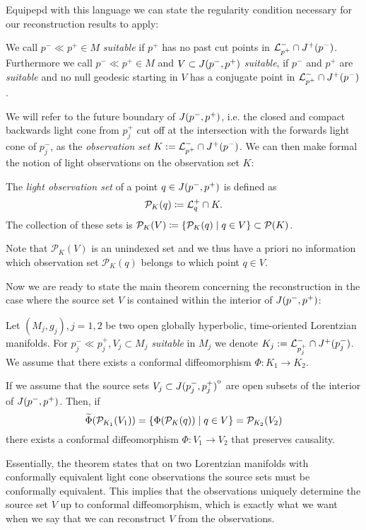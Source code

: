 Equipepd with this language we can state the regularity condition necessary for our reconstruction results to apply:
\begin{definition}[Suitable]
    We call $p^-\ll p^+\in M$  \emph{suitable} if $p^+$ has no past cut points in ${\mathcal{L}}^-_{p^+}\cap J^+(p^-)$. Furthermore we call $p^-\ll p^+\in M$ and $V\subset J(p^-,p^+)$ \emph{suitable}, if $p^-$ and $p^+$ are \emph{suitable} and no null geodesic starting in $V$ has a conjugate point in ${\mathcal{L}}^-_{p^+}\cap J^+(p^-)$.
\end{definition}
We will refer to the future boundary of $J(p^-,p^+)$, i.e. the closed and compact backwards light cone from $p_j^+$ cut off at the intersection with the forwards light cone of $p_j^-$, as the \emph{observation set} $K:={\mathcal{L}}^-_{p^+}\cap J^+(p^-)$. We can then make formal the notion of light observations on the observation set $K$:
\begin{definition}
    The \emph{light observation set} of a point $q\in J(p^-,p^+)$ is defined as
    \[
    {\mathcal{P}}_K(q) \coloneqq {\mathcal{L}}^+_q \cap K.
    \]
    The collection of these sets is ${\mathcal{P}}_K(V)\coloneqq\{\mathcal{P}_K(q)\mid q\in V\}\subset {\mathcal{P}}(K)$.
\end{definition}
Note that $\mathcal{P}_K(V)$ is an unindexed set and we thus have a priori no information which observation set $\mathcal{P}_K(q)$ belongs to which point $q\in V$.

Now we are ready to state the main theorem concerning the reconstruction in the case where the source set $V$ is contained within the interior of $J(p^-,p^+)$:
\begin{theorem}\label{thm:intreconstr}
    Let $(M_j,g_j), j=1,2$ be two open globally hyperbolic, time-oriented Lorentzian manifolds. For $p_j^-\ll p_j^+, V_j\subset M_j$ \emph{suitable} in $M_j$ we denote $K_j := {\mathcal{L}}^-_{p_j^+} \cap J^+(p_j^-)$. We assume that there exists a conformal diffeomorphism $\Phi:K_1\to K_2$. 
    
    If we assume that the source sets $V_j\subset{\kern0ptJ(p_j^-,p_j^+)}^{\mathrm{o}}$ are open subsets of the interior of $J(p^-,p^+)$. 
    Then, if 
    \[
    \widetilde{\Phi}({\mathcal{P}}_{K_1}(V_1)) = \{\Phi({\mathcal{P}}_K(q))\mid q \in V\} = {\mathcal{P}}_{K_2}(V_2)
    \]
    there exists a conformal diffeomorphism $\Phi:V_1\to V_2$ that preserves causality.
\end{theorem}

Essentially, the theorem states that on two Lorentzian manifolds with conformally equivalent light cone observations the source sets must be conformally equivalent. This implies that the observations uniquely determine the source set $V$ up to conformal diffeomorphism, which is exactly what we want when we say that we can reconstruct $V$ from the observations. 

